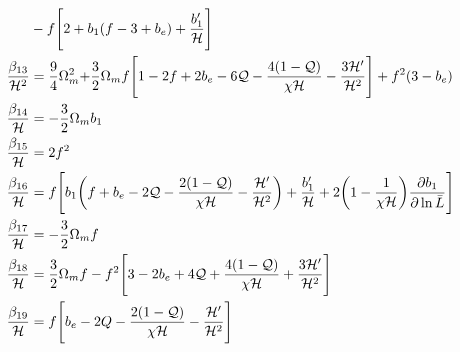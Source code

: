 \begin{align}
&- f\Bigg[2+b_{1}(f-3+b_{e}) + \frac{b_{1}'}{\mathcal{H}}\Bigg]  \\ 
\frac{\beta_{13}}{\mathcal{H}^{2}} &= \frac{9}{4}\Omega_{m}^{2} {+ \frac{3}{2}\Omega_{m}f\Bigg[1-2f+2b_{e}-{6}\mathcal{Q}-\frac{4(1-\mathcal{Q})}{\chi\mathcal{H}}-\frac{3\mathcal{H}'}{\mathcal{H}^{2}}\Bigg]} + f^{2}(3-b_{e}) \\ 
\frac{\beta_{14}}{\mathcal{H}} &= -\frac{3}{2}\Omega_{m}b_{1} \\
\frac{\beta_{15}}{\mathcal{H}} &= 2f^{2}  \\ 
\frac{\beta_{16}}{\mathcal{H}} &= f\Bigg[b_{1}\bigg(f+b_{e}-2\mathcal{Q}-\frac{2(1-\mathcal{Q})}{\chi\mathcal{H}}-\frac{\mathcal{H}'}{\mathcal{H}^{2}}\bigg) + \frac{b_{1}'}{\mathcal{H}} + 2\bigg(1-\frac{1}{\chi\mathcal{H}}\bigg)\frac{\partial b_{1}}{\partial \ln \bar{L}}\Bigg] \\
\frac{\beta_{17}}{\mathcal{H}} &= -\frac{3}{2}\Omega_{m}f \\
\frac{\beta_{18}}{\mathcal{H}} &= \frac{3}{2}\Omega_{m}f -f^{2}\Bigg[3-2b_{e}+{4}\mathcal{Q}+\frac{4(1-\mathcal{Q})}{\chi\mathcal{H}}+\frac{3\mathcal{H}'}{\mathcal{H}^{2}}\Bigg] \\
\frac{\beta_{19}}{\mathcal{H}} &= f\Bigg[b_{e}-2Q-\frac{2(1-\mathcal{Q})}{\chi\mathcal{H}}-\frac{\mathcal{H}'}{\mathcal{H}^{2}}\Bigg] 
\end{align}